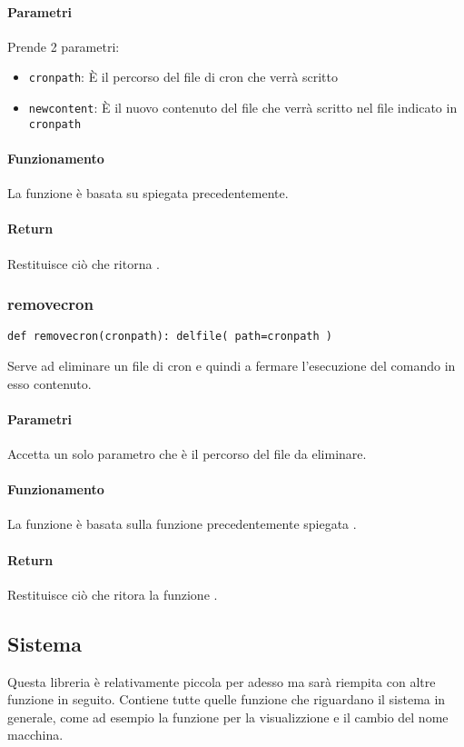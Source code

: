 \documentclass[11pt]{article}
\begin{document}
\paragraph{Parametri}
Prende 2 parametri:
\begin{itemize}
	\item{\texttt{cronpath}: È il percorso del file di cron che verrà scritto}
	\item{\texttt{newcontent}: È il nuovo contenuto del file che verrà scritto nel file indicato in \texttt{cronpath}}
\end{itemize}
\paragraph{Funzionamento}
La funzione è basata su  spiegata precedentemente.
\paragraph{Return}
Restituisce ciò che ritorna .

\subsubsection{removecron}\label{removecron}
\begin{lstlisting}
def removecron(cronpath): delfile( path=cronpath )
\end{lstlisting}
Serve ad eliminare un file di cron e quindi a fermare l'esecuzione del comando in esso contenuto.
\paragraph{Parametri}
Accetta un solo parametro che è il percorso del file da eliminare.
\paragraph{Funzionamento}
La funzione è basata sulla funzione precedentemente spiegata .
\paragraph{Return}
Restituisce ciò che ritora la funzione .

\subsection{Sistema}\label{system}
Questa libreria è relativamente piccola per adesso ma sarà riempita con altre funzione in seguito. Contiene
tutte quelle funzione che riguardano il sistema in generale, come ad esempio la funzione per la visualizzione
e il cambio del nome macchina.
\end{document}

